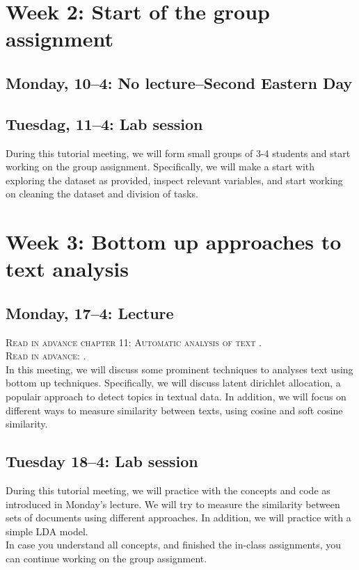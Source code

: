 \section*{Week 2: Start of the group assignment }

\subsection*{Monday, 10--4: No lecture--Second Eastern Day}

\subsection*{Tuesdag, 11--4: Lab session}
During this tutorial meeting, we will form small groups of 3-4 students and start working on the group assignment. Specifically, we will make a start with exploring the dataset as provided, inspect relevant variables, and start working on cleaning the dataset and division of tasks. 

\section*{Week 3: Bottom up approaches to text analysis}

\subsection*{Monday, 17--4: Lecture}
\textsc{Read in advance chapter 11: Automatic analysis of text \cite{van_atteveldt_computational_2022}.} \\
\textsc{Read in advance: \cite{Brinberg2021}.} \\

In this meeting, we will discuss some prominent techniques to analyses text using bottom up techniques. Specifically, we will discuss latent dirichlet allocation, a populair approach to detect topics in textual data. In addition, we will focus on different ways to measure similarity between texts, using cosine and soft cosine similarity. 

\subsection*{Tuesday 18--4: Lab session}
During this tutorial meeting, we will practice with the concepts and code as introduced in Monday's lecture. We will try to measure the similarity between sets of documents using different approaches. In addition, we will practice with a simple LDA model. \\
In case you understand all concepts, and finished the in-class assignments, you can continue working on the group assignment. 


